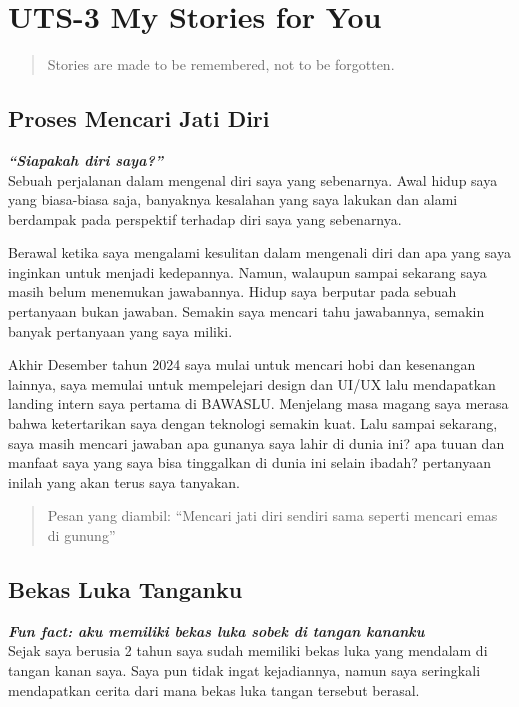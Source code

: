 \documentclass[
  letterpaper,
  DIV=11,
  numbers=noendperiod]{scrreprt}
\begin{document}

\chapter{UTS-3 My Stories for You}\label{uts-3-my-stories-for-you}

\begin{quote}
Stories are made to be remembered, not to be forgotten.
\end{quote}

\section{Proses Mencari Jati Diri}\label{proses-mencari-jati-diri}

\textbf{\emph{``Siapakah diri saya?''}}\\
Sebuah perjalanan dalam mengenal diri saya yang sebenarnya. Awal hidup
saya yang biasa-biasa saja, banyaknya kesalahan yang saya lakukan dan
alami berdampak pada perspektif terhadap diri saya yang sebenarnya.

Berawal ketika saya mengalami kesulitan dalam mengenali diri dan apa
yang saya inginkan untuk menjadi kedepannya. Namun, walaupun sampai
sekarang saya masih belum menemukan jawabannya. Hidup saya berputar pada
sebuah pertanyaan bukan jawaban. Semakin saya mencari tahu jawabannya,
semakin banyak pertanyaan yang saya miliki.

Akhir Desember tahun 2024 saya mulai untuk mencari hobi dan kesenangan
lainnya, saya memulai untuk mempelejari design dan UI/UX lalu
mendapatkan landing intern saya pertama di BAWASLU. Menjelang masa
magang saya merasa bahwa ketertarikan saya dengan teknologi semakin
kuat. Lalu sampai sekarang, saya masih mencari jawaban apa gunanya saya
lahir di dunia ini? apa tuuan dan manfaat saya yang saya bisa tinggalkan
di dunia ini selain ibadah? pertanyaan inilah yang akan terus saya
tanyakan.

\begin{quote}
Pesan yang diambil: ``Mencari jati diri sendiri sama seperti mencari
emas di gunung''
\end{quote}

\section{Bekas Luka Tanganku}\label{bekas-luka-tanganku}

\textbf{\emph{Fun fact: aku memiliki bekas luka sobek di tangan
kananku}}\\
Sejak saya berusia 2 tahun saya sudah memiliki bekas luka yang mendalam
di tangan kanan saya. Saya pun tidak ingat kejadiannya, namun saya
seringkali mendapatkan cerita dari mana bekas luka tangan tersebut
berasal.
\end{document}
